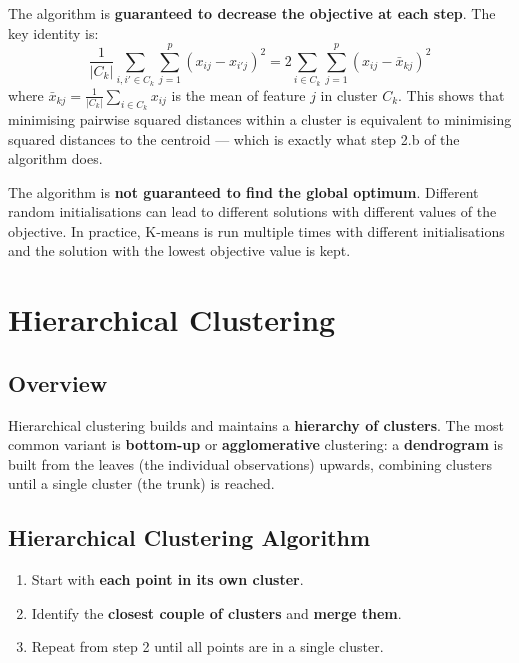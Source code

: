 \documentclass[11pt,a4paper]{article}
\theoremstyle{definition}
\theoremstyle{plain}
\theoremstyle{remark}
\begin{document}
The algorithm is \textbf{guaranteed to decrease the objective at each step}. The key identity is:
\[
    \frac{1}{|C_k|} \sum_{i, i' \in C_k} \sum_{j=1}^{p} (x_{ij} - x_{i'j})^2 = 2 \sum_{i \in C_k} \sum_{j=1}^{p} (x_{ij} - \bar{x}_{kj})^2
\]
where $\bar{x}_{kj} = \tfrac{1}{|C_k|} \sum_{i \in C_k} x_{ij}$ is the mean of feature $j$ in cluster $C_k$. This shows that minimising pairwise squared distances within a cluster is equivalent to minimising squared distances to the centroid — which is exactly what step 2.b of the algorithm does.

\begin{tcolorbox}[colback=orange!5!white,colframe=orange!75!black,title=\textbf{Local Optima}]
The algorithm is \textbf{not guaranteed to find the global optimum}. Different random initialisations can lead to different solutions with different values of the objective. In practice, K-means is run multiple times with different initialisations and the solution with the lowest objective value is kept.
\end{tcolorbox}


\section{Hierarchical Clustering}

\subsection{Overview}

\begin{tcolorbox}[colback=blue!5!white,colframe=blue!75!black,title=\textbf{Hierarchical Clustering}]
Hierarchical clustering builds and maintains a \textbf{hierarchy of clusters}. The most common variant is \textbf{bottom-up} or \textbf{agglomerative} clustering: a \textbf{dendrogram} is built from the leaves (the individual observations) upwards, combining clusters until a single cluster (the trunk) is reached.
\end{tcolorbox}

\subsection{Hierarchical Clustering Algorithm}

\begin{tcolorbox}[colback=green!5!white,colframe=green!75!black,title=\textbf{Agglomerative Hierarchical Clustering}]
\begin{enumerate}
    \item Start with \textbf{each point in its own cluster}.
    \item Identify the \textbf{closest couple of clusters} and \textbf{merge them}.
    \item Repeat from step 2 until all points are in a single cluster.
\end{enumerate}
\end{tcolorbox}
\end{document}
